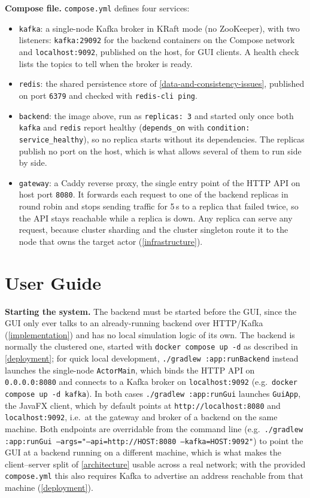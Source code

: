 \documentclass{scrreprt}
\begin{document}
\textbf{Compose file.} \texttt{compose.yml} defines four services:
\begin{itemize}
  \item \texttt{kafka}: a single-node Kafka broker in KRaft mode (no ZooKeeper), with two
  listeners: \texttt{kafka:29092} for the backend containers on the Compose network and
  \texttt{localhost:9092}, published on the host, for GUI clients. A health check lists the
  topics to tell when the broker is ready.
  \item \texttt{redis}: the shared persistence store of \cref{data-and-consistency-issues},
  published on port \texttt{6379} and checked with \texttt{redis-cli ping}.
  \item \texttt{backend}: the image above, run as \texttt{replicas: 3} and started only once
  both \texttt{kafka} and \texttt{redis} report healthy (\texttt{depends\_on} with
  \texttt{condition: service\_healthy}), so no replica starts without its dependencies. The
  replicas publish no port on the host, which is what allows several of them to run side by
  side.
  \item \texttt{gateway}: a Caddy reverse proxy, the single entry point of the HTTP API on host
  port \texttt{8080}. It forwards each request to one of the backend replicas in round robin
  and stops sending traffic for 5\,s to a replica that failed twice, so the API stays
  reachable while a replica is down. Any replica can serve any request, because cluster
  sharding and the cluster singleton route it to the node that owns the target actor
  (\cref{infrastructure}).
\end{itemize}

\section{User Guide}\label{user-guide}

\textbf{Starting the system.} The backend must be started before the GUI, since the GUI only
ever talks to an already-running backend over HTTP/Kafka (\cref{implementation}) and has no
local simulation logic of its own. The backend is normally the clustered one, started with
\texttt{docker compose up -d} as described in \cref{deployment}; for quick local development,
\texttt{./gradlew :app:runBackend} instead launches the single-node \texttt{ActorMain}, which
binds the HTTP API on \texttt{0.0.0.0:8080} and connects to a Kafka broker on
\texttt{localhost:9092} (e.g.\ \texttt{docker compose up -d kafka}). In both cases
\texttt{./gradlew :app:runGui} launches \texttt{GuiApp}, the JavaFX client, which by default
points at \texttt{http://localhost:8080} and \texttt{localhost:9092}, i.e.\ at the gateway and
broker of a backend on the same machine. Both endpoints are overridable from the command line
(e.g.\ \texttt{./gradlew :app:runGui --args="--api=http://HOST:8080 --kafka=HOST:9092"}) to
point the GUI at a backend running on a different machine, which is what makes the
client--server split of \cref{architecture} usable across a real network; with the provided
\texttt{compose.yml} this also requires Kafka to advertise an address reachable from that
machine (\cref{deployment}).
\end{document}
